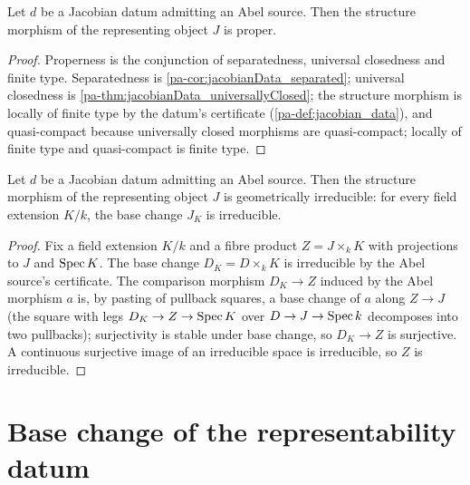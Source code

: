 \begin{theorem}
  \label{pa-thm:jacobianData_proper}
  \leanok

  Let \(d\) be a Jacobian datum admitting an Abel source. Then the structure
  morphism of the representing object \(J\) is proper.
\end{theorem}
\begin{proof}
  \leanok
  Properness is the conjunction of separatedness, universal closedness and
  finite type. Separatedness is \ref{pa-cor:jacobianData_separated}; universal
  closedness is \ref{pa-thm:jacobianData_universallyClosed}; the structure morphism
  is locally of finite type by the datum's certificate
  (\ref{pa-def:jacobian_data}), and quasi-compact because universally closed
  morphisms are quasi-compact; locally of finite type and quasi-compact is
  finite type.
\end{proof}

\begin{theorem}
  \label{pa-thm:jacobianData_geomIrreducible}
  \leanok

  Let \(d\) be a Jacobian datum admitting an Abel source. Then the structure
  morphism of the representing object \(J\) is geometrically irreducible: for
  every field extension \(K/k\), the base change \(J_K\) is irreducible.
\end{theorem}
\begin{proof}
  \leanok
  Fix a field extension \(K/k\) and a fibre product \(Z = J \times_k K\) with
  projections to \(J\) and \(\operatorname{Spec} K\). The base change
  \(D_K = D \times_k K\) is irreducible by the Abel source's certificate. The
  comparison morphism \(D_K \to Z\) induced by the Abel morphism \(a\) is,
  by pasting of pullback squares, a base change of \(a\) along
  \(Z \to J\) (the square with legs \(D_K \to Z \to \operatorname{Spec} K\) over
  \(D \to J \to \operatorname{Spec} k\) decomposes into two pullbacks); surjectivity is
  stable under base change, so \(D_K \to Z\) is surjective. A continuous
  surjective image of an irreducible space is irreducible, so \(Z\) is
  irreducible.
\end{proof}

\section{Base change of the representability datum}
\label{pa-sec:jacobian_datum_basechange}

